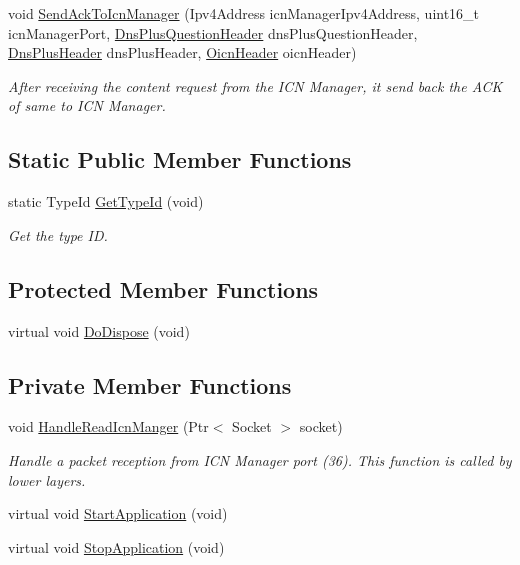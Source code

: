 \begin{DoxyCompactItemize}
void \hyperlink{classns3_1_1OicnServer_af9a0c2a5aae516f33ae3a6a452b6e61c}{Send\-Ack\-To\-Icn\-Manager} (Ipv4\-Address icn\-Manager\-Ipv4\-Address, uint16\-\_\-t icn\-Manager\-Port, \hyperlink{classns3_1_1DnsPlusQuestionHeader}{Dns\-Plus\-Question\-Header} dns\-Plus\-Question\-Header, \hyperlink{classns3_1_1DnsPlusHeader}{Dns\-Plus\-Header} dns\-Plus\-Header, \hyperlink{classns3_1_1OicnHeader}{Oicn\-Header} oicn\-Header)
\begin{DoxyCompactList}\small\item\em After receiving the content request from the I\-C\-N Manager, it send back the A\-C\-K of same to I\-C\-N Manager. \end{DoxyCompactList}\end{DoxyCompactItemize}
\subsection*{Static Public Member Functions}
\begin{DoxyCompactItemize}
\item 
static Type\-Id \hyperlink{classns3_1_1OicnServer_a6feccce194eec32aeeaaed73b215c7ec}{Get\-Type\-Id} (void)
\begin{DoxyCompactList}\small\item\em Get the type I\-D. \end{DoxyCompactList}\end{DoxyCompactItemize}
\subsection*{Protected Member Functions}
\begin{DoxyCompactItemize}
\item 
virtual void \hyperlink{classns3_1_1OicnServer_a6a2cf9407f2c0d0168d1f2d99c57ba6e}{Do\-Dispose} (void)
\end{DoxyCompactItemize}
\subsection*{Private Member Functions}
\begin{DoxyCompactItemize}
\item 
void \hyperlink{classns3_1_1OicnServer_acc544f5a8c2941ebbec576dd87ebbd4b}{Handle\-Read\-Icn\-Manger} (Ptr$<$ Socket $>$ socket)
\begin{DoxyCompactList}\small\item\em Handle a packet reception from I\-C\-N Manager port (36). This function is called by lower layers. \end{DoxyCompactList}\item 
virtual void \hyperlink{classns3_1_1OicnServer_a185a5fb39786caf3f89a65b08f61a6e8}{Start\-Application} (void)
\item 
virtual void \hyperlink{classns3_1_1OicnServer_a12256e51cce0c25a66eef8cc256e367e}{Stop\-Application} (void)
\end{DoxyCompactItemize}
